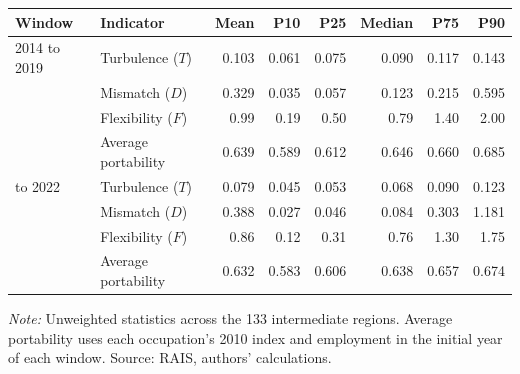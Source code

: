 {\small
\begin{threeparttable}
\begin{tabular}{llrrrrrr}
\toprule
Window & Indicator & Mean & P10 & P25 & Median & P75 & P90 \\
\midrule
2014 to 2019 & Turbulence ($T$) & 0.103 & 0.061 & 0.075 & 0.090 & 0.117 & 0.143 \\
 & Mismatch ($D$) & 0.329 & 0.035 & 0.057 & 0.123 & 0.215 & 0.595 \\
 & Flexibility ($F$) & 0.99 & 0.19 & 0.50 & 0.79 & 1.40 & 2.00 \\
 & Average portability & 0.639 & 0.589 & 0.612 & 0.646 & 0.660 & 0.685 \\
\addlinespace[3pt]
2019 to 2022 & Turbulence ($T$) & 0.079 & 0.045 & 0.053 & 0.068 & 0.090 & 0.123 \\
 & Mismatch ($D$) & 0.388 & 0.027 & 0.046 & 0.084 & 0.303 & 1.181 \\
 & Flexibility ($F$) & 0.86 & 0.12 & 0.31 & 0.76 & 1.30 & 1.75 \\
 & Average portability & 0.632 & 0.583 & 0.606 & 0.638 & 0.657 & 0.674 \\
\bottomrule
\end{tabular}
\begin{tablenotes}[flushleft]\footnotesize
\item \textit{Note:} Unweighted statistics across the 133 intermediate regions. Average portability uses each occupation's 2010 index and employment in the initial year of each window. Source: RAIS, authors' calculations.
\end{tablenotes}
\end{threeparttable}
}
